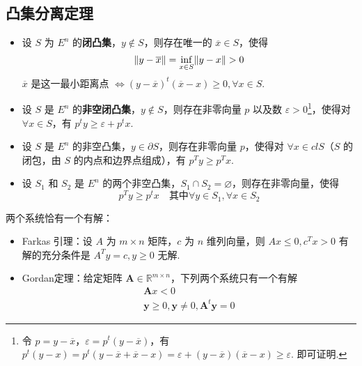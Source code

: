 \subsection{凸集分离定理}
\begin{theorem}[凸集分离定理]
    \text{}
    \begin{itemize}
        \item 设 $S$ 为 $E^n$ 的\textbf{闭凸集}，$y\notin S$，则存在唯一的 $\overline{x} \in S$，使得\[ \norm{y - \overline{x}} = \underset{x \in S}{\inf} \norm{y - x} > 0 \]
        $\overline{x}$ 是这一最小距离点 $\Longleftrightarrow (y - \overline{x})^t(\overline{x} - x) \ge 0, \forall x \in S$.

        \item 设 $S$ 是 $E^n$ 的\textbf{非空闭凸集}，$y\notin S$，则存在非零向量 $p$ 以及数 $\varepsilon > 0$\footnote{令 $p = y - \overline{x}$，$\varepsilon = p^t(y - \overline{x})$，有 $p^t(y - x) = p^t(y - \overline{x} + \overline{x} - x) = \varepsilon + (y - \overline{x})(\overline{x} - x) \ge \varepsilon$. 即可证明.}，使得对 $\forall x \in S$，有 $p^t y \ge \varepsilon + p^t x$.
        
        \item 设 $S$ 是 $E^n$ 的非空凸集，$y\in \partial S$，则存在非零向量 $p$，使得对 $\forall x \in clS$（$S$ 的闭包，由 $S$ 的内点和边界点组成），有 $p^Ty \ge p^Tx$.
        
        \item 设 $S_1$ 和 $S_2$ 是 $E^n$ 的两个非空凸集，$S_1 \cap S_2 = \varnothing$，则存在非零向量，使得\[p^Ty \ge p^t x \quad \text{其中}\forall y \in S_1, \forall x \in S_2\]
    \end{itemize}
\end{theorem}



\begin{note}
    两个系统恰有一个有解：
    \begin{itemize}
        \item Farkas 引理：设 $A$ 为 $m\times n$ 矩阵，$c$ 为 $n$ 维列向量，则 $Ax \le 0, c^Tx > 0$ 有解的充分条件是 $A^Ty = c, y\ge 0$ 无解.
        \item Gordan定理：给定矩阵 $\boldsymbol{A} \in \mathbb{R}^{m\times n}$，下列两个系统只有一个有解
        \begin{gather*}
            \boldsymbol{A}x < 0\\
            \boldsymbol{y} \ge 0, \boldsymbol{y} \neq 0, \boldsymbol{A}^t\boldsymbol{y} = 0
        \end{gather*}
    \end{itemize}
\end{note}

